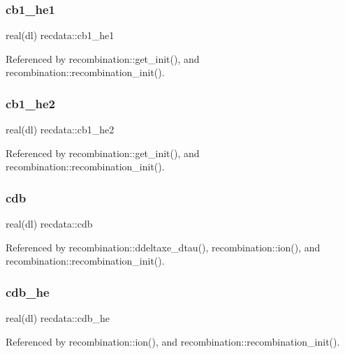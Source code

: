 \subsubsection{\texorpdfstring{cb1\+\_\+he1}{cb1\_he1}}
{\footnotesize\ttfamily real(dl) recdata\+::cb1\+\_\+he1}



Referenced by recombination\+::get\+\_\+init(), and recombination\+::recombination\+\_\+init().

\mbox{\label{namespacerecdata_af94354830fdc5a327a28087bff0bff81}} 
\subsubsection{\texorpdfstring{cb1\+\_\+he2}{cb1\_he2}}
{\footnotesize\ttfamily real(dl) recdata\+::cb1\+\_\+he2}



Referenced by recombination\+::get\+\_\+init(), and recombination\+::recombination\+\_\+init().

\mbox{\label{namespacerecdata_a0b6cc26e2d2688842af68cd27723b349}} 
\subsubsection{\texorpdfstring{cdb}{cdb}}
{\footnotesize\ttfamily real(dl) recdata\+::cdb}



Referenced by recombination\+::ddeltaxe\+\_\+dtau(), recombination\+::ion(), and recombination\+::recombination\+\_\+init().

\mbox{\label{namespacerecdata_a158d229f115a9b6b137ba43b674bf626}} 
\subsubsection{\texorpdfstring{cdb\+\_\+he}{cdb\_he}}
{\footnotesize\ttfamily real(dl) recdata\+::cdb\+\_\+he}



Referenced by recombination\+::ion(), and recombination\+::recombination\+\_\+init().

